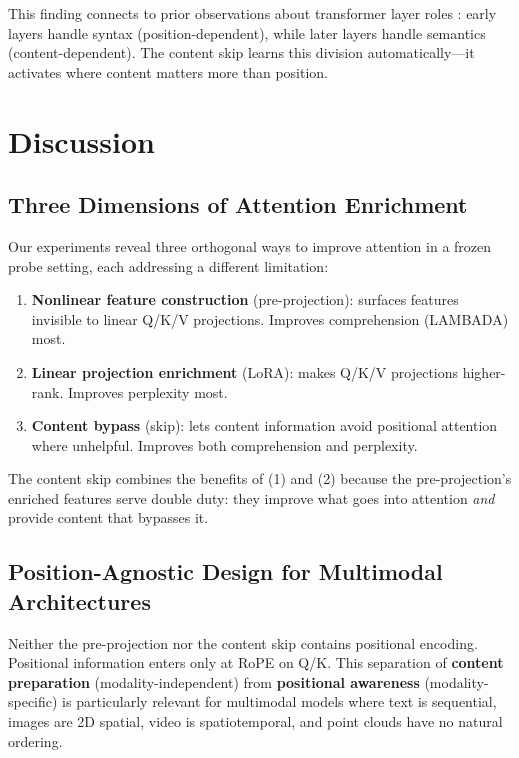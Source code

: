 \documentclass[11pt]{article}
\begin{document}
This finding connects to prior observations about transformer layer roles \citep{tenney2019bert}: early layers handle syntax (position-dependent), while later layers handle semantics (content-dependent). The content skip learns this division automatically---it activates where content matters more than position.

\section{Discussion}

\subsection{Three Dimensions of Attention Enrichment}

Our experiments reveal three orthogonal ways to improve attention in a frozen probe setting, each addressing a different limitation:

\begin{enumerate}
    \item \textbf{Nonlinear feature construction} (pre-projection): surfaces features invisible to linear Q/K/V projections. Improves comprehension (LAMBADA) most.
    \item \textbf{Linear projection enrichment} (LoRA): makes Q/K/V projections higher-rank. Improves perplexity most.
    \item \textbf{Content bypass} (skip): lets content information avoid positional attention where unhelpful. Improves both comprehension and perplexity.
\end{enumerate}

The content skip combines the benefits of (1) and (2) because the pre-projection's enriched features serve double duty: they improve what goes into attention \textit{and} provide content that bypasses it.

\subsection{Position-Agnostic Design for Multimodal Architectures}

Neither the pre-projection nor the content skip contains positional encoding. Positional information enters only at RoPE on Q/K. This separation of \textbf{content preparation} (modality-independent) from \textbf{positional awareness} (modality-specific) is particularly relevant for multimodal models where text is sequential, images are 2D spatial, video is spatiotemporal, and point clouds have no natural ordering.
\end{document}
